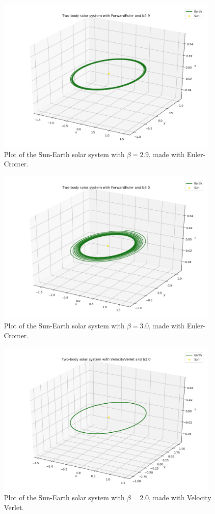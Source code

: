 \documentclass{article}
\begin{document}
    \begin{figure}[H]
        \centering
        \includegraphics[width = 11cm]{img/plot3D_S_E_F_b29.png}
        \caption{Plot of the Sun-Earth solar system with $\beta = 2.9$, made with Euler-Cromer.}
        \label{fig:plot3D_S_E_F_b29}
    \end{figure}

    \begin{figure}[H]
        \centering
        \includegraphics[width = 11cm]{img/plot3D_S_E_F_b30.png}
        \caption{Plot of the Sun-Earth solar system with $\beta = 3.0$, made with Euler-Cromer.}
        \label{fig:plot3D_S_E_F_b30}
    \end{figure}

    \begin{figure}[H]
        \centering
        \includegraphics[width = 11cm]{img/plot3D_S_E_V_b20.png}
        \caption{Plot of the Sun-Earth solar system with $\beta = 2.0$, made with Velocity Verlet.}
        \label{fig:plot3D_S_E_V_b20}
    \end{figure}
\end{document}
